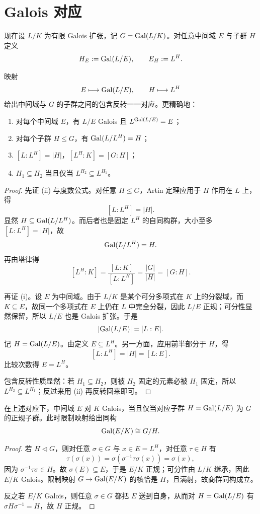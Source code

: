 \section{Galois 对应}

现在设 $L/K$ 为有限 Galois 扩张，记 $G=\mathrm{Gal}(L/K)$。对任意中间域 $E$ 与子群 $H$ 定义
\[
 H_E:=\mathrm{Gal}(L/E),\qquad E_H:=L^H.
\]

\begin{theorem}[Galois 对应]
映射
\[
 E\longmapsto \mathrm{Gal}(L/E),\qquad H\longmapsto L^H
\]
给出中间域与 $G$ 的子群之间的包含反转一一对应。更精确地：
\begin{enumerate}[label=(\roman*)]
\item 对每个中间域 $E$，有 $L/E$ Galois 且 $L^{\mathrm{Gal}(L/E)}=E$；
\item 对每个子群 $H\le G$，有 $\mathrm{Gal}(L/L^H)=H$；
\item $[L:L^H]=|H|$，$[L^H:K]=[G:H]$；
\item $H_1\subseteq H_2$ 当且仅当 $L^{H_2}\subseteq L^{H_1}$。
\end{enumerate}
\end{theorem}

\begin{proof}
先证 (ii) 与度数公式。对任意 $H\le G$，Artin 定理应用于 $H$ 作用在 $L$ 上，得
\[
 [L:L^H]=|H|.
\]
显然 $H\subseteq \mathrm{Gal}(L/L^H)$。而后者也是固定 $L^H$ 的自同构群，大小至多 $[L:L^H]=|H|$，故
\[
 \mathrm{Gal}(L/L^H)=H.
\]
再由塔律得
\[
 [L^H:K]=\frac{[L:K]}{[L:L^H]}=\frac{|G|}{|H|}=[G:H].
\]

再证 (i)。设 $E$ 为中间域。由于 $L/K$ 是某个可分多项式在 $K$ 上的分裂域，而 $K\subseteq E$，故同一个多项式在 $E$ 上仍在 $L$ 中完全分裂，因此 $L/E$ 正规；可分性显然保留，所以 $L/E$ 也是 Galois 扩张。于是
\[
 |\mathrm{Gal}(L/E)|=[L:E].
\]
记 $H=\mathrm{Gal}(L/E)$。由定义 $E\subseteq L^H$。另一方面，应用前半部分于 $H$，得
\[
 [L:L^H]=|H|=[L:E].
\]
比较次数得 $E=L^H$。

包含反转性质显然：若 $H_1\subseteq H_2$，则被 $H_2$ 固定的元素必被 $H_1$ 固定，所以 $L^{H_2}\subseteq L^{H_1}$；反过来用 (ii) 再反转回来即可。
\end{proof}

\begin{theorem}[正规子群与商群]
在上述对应下，中间域 $E$ 对 $K$ Galois，当且仅当对应子群 $H=\mathrm{Gal}(L/E)$ 为 $G$ 的正规子群。此时限制映射给出同构
\[
 \mathrm{Gal}(E/K)\cong G/H.
\]
\end{theorem}

\begin{proof}
若 $H\triangleleft G$，则对任意 $\sigma\in G$ 与 $x\in E=L^H$，对任意 $\tau\in H$ 有
\[
 \tau(\sigma(x))=\sigma(\sigma^{-1}\tau\sigma(x))=\sigma(x),
\]
因为 $\sigma^{-1}\tau\sigma\in H$。故 $\sigma(E)\subseteq E$，于是 $E/K$ 正规；可分性由 $L/K$ 继承，因此 $E/K$ Galois。限制映射 $G\to \mathrm{Gal}(E/K)$ 的核恰是 $H$，且满射，故商群同构成立。

反之若 $E/K$ Galois，则任意 $\sigma\in G$ 都把 $E$ 送到自身，从而对 $H=\mathrm{Gal}(L/E)$ 有 $\sigma H\sigma^{-1}=H$，故 $H$ 正规。
\end{proof}

